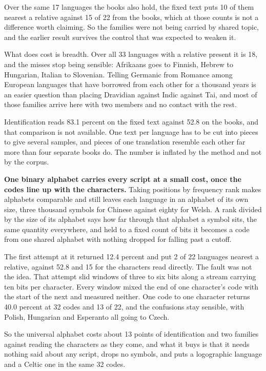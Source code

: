 Over the same 17 languages the books also hold, the fixed text puts 10 of them nearest a relative against 15 of 22 from the books, which at those counts is not a difference worth claiming. So the families were not being carried by shared topic, and the earlier result survives the control that was expected to weaken it.

What does cost is breadth. Over all 33 languages with a relative present it is 18, and the misses stop being sensible: Afrikaans goes to Finnish, Hebrew to Hungarian, Italian to Slovenian. Telling Germanic from Romance among European languages that have borrowed from each other for a thousand years is an easier question than placing Dravidian against Indic against Tai, and most of those families arrive here with two members and no contact with the rest.

Identification reads 83.1 percent on the fixed text against 52.8 on the books, and that comparison is not available. One text per language has to be cut into pieces to give several samples, and pieces of one translation resemble each other far more than four separate books do. The number is inflated by the method and not by the corpus.

\textbf{One binary alphabet carries every script at a small cost, once the codes line up with the characters.} Taking positions by frequency rank makes alphabets comparable and still leaves each language in an alphabet of its own size, three thousand symbols for Chinese against eighty for Welsh. A rank divided by the size of its alphabet says how far through that alphabet a symbol sits, the same quantity everywhere, and held to a fixed count of bits it becomes a code from one shared alphabet with nothing dropped for falling past a cutoff.

The first attempt at it returned 12.4 percent and put 2 of 22 languages nearest a relative, against 52.8 and 15 for the characters read directly. The fault was not the idea. That attempt slid windows of three to six bits along a stream carrying ten bits per character. Every window mixed the end of one character's code with the start of the next and measured neither. One code to one character returns 40.0 percent at 32 codes and 13 of 22, and the confusions stay sensible, with Polish, Hungarian and Esperanto all going to Czech.

So the universal alphabet costs about 13 points of identification and two families against reading the characters as they come, and what it buys is that it needs nothing said about any script, drops no symbols, and puts a logographic language and a Celtic one in the same 32 codes.

